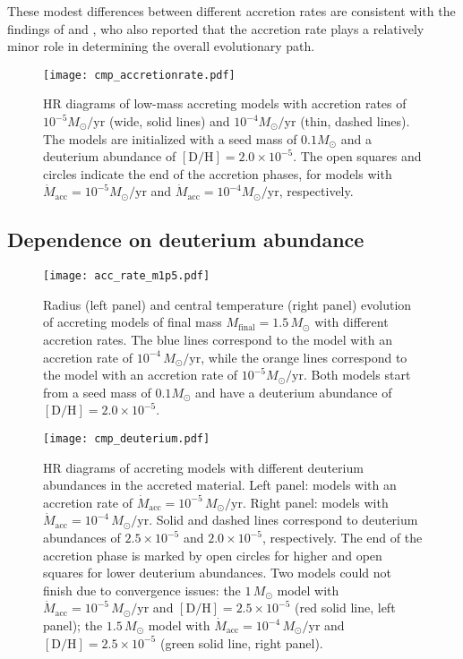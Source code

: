 \documentclass[12pt,a4paper]{article}
\newcommand{\mr}{\mathrm}
\begin{document}
These modest differences between different accretion rates are consistent with the findings of \textcite{HosokawaEtAl2011} and \textcite{KunitomoEtAl2017}, who also reported that the accretion rate plays a relatively minor role in determining the overall evolutionary path.

\begin{figure}[htbp]
  \centering  
  \texttt{[image: cmp\_accretionrate.pdf]}
  \caption{HR diagrams of low-mass accreting models with accretion rates of $10^{-5} M_\odot/\mr{yr}$ (wide, solid lines) and $10^{-4} M_\odot/\mr{yr}$ (thin, dashed lines). The models are initialized with a seed mass of $0.1 M_\odot$ and a deuterium abundance of $[\mr{D/H}] = 2.0\times 10^{-5}$. The open squares and circles indicate the end of the accretion phases, for models with $\dot{M}_\mr{acc} = 10^{-5} M_\odot/\mr{yr}$ and $\dot{M}_\mr{acc} = 10^{-4} M_\odot/\mr{yr}$, respectively.} \label{fig:comp_acc_rate}
\end{figure}

\subsection{Dependence on deuterium abundance}
\label{sec:deuterium_abundance}

\begin{figure}
  \centering  
  \texttt{[image: acc\_rate\_m1p5.pdf]}
  \caption{Radius (left panel) and central temperature (right panel) evolution of accreting models of final mass $M_\mr{final} = 1.5\,M_\odot$ with different accretion rates. The blue lines correspond to the model with an accretion rate of $10^{-4}\,M_\odot/\mr{yr}$, while the orange lines correspond to the model with an accretion rate of $10^{-5} M_\odot/\mr{yr}$. Both models start from a seed mass of $0.1 M_\odot$ and have a deuterium abundance of $[\mr{D/H}] = 2.0\times 10^{-5}$.}
  \label{fig:comp_acc_rate_m1p5}
\end{figure}

\begin{figure}
  \centering
  \texttt{[image: cmp\_deuterium.pdf]}
  \caption{HR diagrams of accreting models with different deuterium abundances in the accreted material. Left panel: models with an accretion rate of $\dot{M}_\mr{acc} = 10^{-5}\,M_\odot/\mr{yr}$. Right panel: models with $\dot{M}_\mr{acc} = 10^{-4}\,M_\odot/\mr{yr}$. Solid and dashed lines correspond to deuterium abundances of $2.5 \times 10^{-5}$ and $2.0 \times 10^{-5}$, respectively. The end of the accretion phase is marked by open circles for higher and open squares for lower deuterium abundances. Two models could not finish due to convergence issues: the $1\,M_\odot$ model with $\dot{M}_\mr{acc} = 10^{-5}\,M_\odot/\mr{yr}$ and $[\mr{D/H}] = 2.5 \times 10^{-5}$ (red solid line, left panel); the $1.5\,M_\odot$ model with $\dot{M}_\mr{acc} = 10^{-4}\,M_\odot/\mr{yr}$ and $[\mr{D/H}]=2.5 \times 10^{-5}$ (green solid line, right panel).} \label{fig:comp_deuterium} 
\end{figure}
\end{document}
